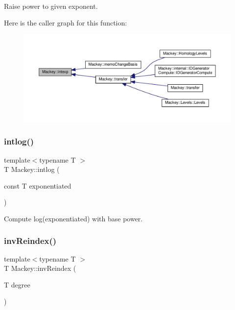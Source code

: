 Raise power to given exponent. 

Here is the caller graph for this function\+:\nopagebreak
\begin{figure}[H]
\begin{center}
\leavevmode
\includegraphics[width=350pt]{namespaceMackey_a4904fdc0fdcf3c23d7f3b80f59b2eafa_icgraph}
\end{center}
\end{figure}
\mbox{\label{namespaceMackey_aa0cac9097035c5fe8448742e22e6f78b}} 
\subsubsection{\texorpdfstring{intlog()}{intlog()}}
{\footnotesize\ttfamily template$<$typename T $>$ \\
T Mackey\+::intlog (\begin{DoxyParamCaption}\item[{const T}]{exponentiated }\end{DoxyParamCaption})\hspace{0.3cm}{\ttfamily [inline]}}



Compute log(exponentiated) with base power. 

\mbox{\label{namespaceMackey_a5efb3695c450e4e590b86f20700f726b}} 
\subsubsection{\texorpdfstring{inv\+Reindex()}{invReindex()}\hspace{0.1cm}{\footnotesize\ttfamily [1/2]}}
{\footnotesize\ttfamily template$<$typename T $>$ \\
T Mackey\+::inv\+Reindex (\begin{DoxyParamCaption}\item[{T}]{degree }\end{DoxyParamCaption})\hspace{0.3cm}{\ttfamily [inline]}}




